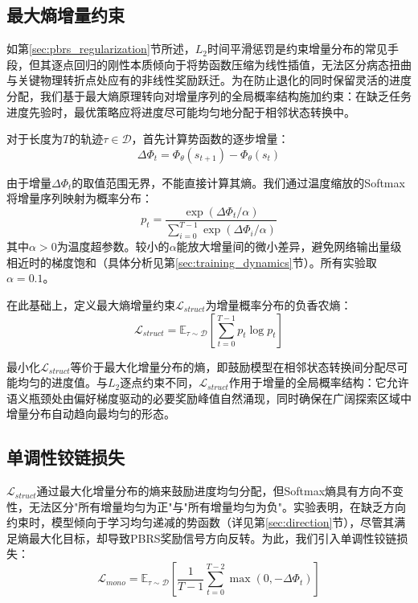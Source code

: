 \subsection{最大熵增量约束}

如第\ref{sec:pbrs_regularization}节所述，$L_2$时间平滑惩罚是约束增量分布的常见手段，但其逐点回归的刚性本质倾向于将势函数压缩为线性插值，无法区分病态扭曲与关键物理转折点处应有的非线性奖励跃迁。为在防止退化的同时保留灵活的进度分配，我们基于最大熵原理\cite{shannon1948,jaynes1957}转向对增量序列的全局概率结构施加约束：在缺乏任务进度先验时，最优策略应将进度尽可能均匀地分配于相邻状态转换中。

对于长度为$T$的轨迹$\tau \in \mathcal{D}$，首先计算势函数的逐步增量：
\begin{equation}
\label{eq:delta_phi}
    \Delta\Phi_t = \Phi_\theta(s_{t+1}) - \Phi_\theta(s_t)
\end{equation}

由于增量$\Delta\Phi_t$的取值范围无界，不能直接计算其熵。我们通过温度缩放的Softmax将增量序列映射为概率分布：
\begin{equation}
\label{eq:softmax}
    p_t = \frac{\exp(\Delta\Phi_t / \alpha)}{\sum_{i=0}^{T-1} \exp(\Delta\Phi_i / \alpha)}
\end{equation}
其中$\alpha > 0$为温度超参数。较小的$\alpha$能放大增量间的微小差异，避免网络输出量级相近时的梯度饱和（具体分析见第\ref{sec:training_dynamics}节）。所有实验取$\alpha = 0.1$。

在此基础上，定义最大熵增量约束$\mathcal{L}_{struct}$为增量概率分布的负香农熵：
\begin{equation}
\label{eq:lstruct}
    \mathcal{L}_{struct} = \mathbb{E}_{\tau \sim \mathcal{D}} \left[ \sum_{t=0}^{T-1} p_t \log p_t \right]
\end{equation}

最小化$\mathcal{L}_{struct}$等价于最大化增量分布的熵，即鼓励模型在相邻状态转换间分配尽可能均匀的进度值。与$L_2$逐点约束不同，$\mathcal{L}_{struct}$作用于增量的全局概率结构：它允许语义瓶颈处由偏好梯度驱动的必要奖励峰值自然涌现，同时确保在广阔探索区域中增量分布自动趋向最均匀的形态。

\subsection{单调性铰链损失}

$\mathcal{L}_{struct}$通过最大化增量分布的熵来鼓励进度均匀分配，但Softmax熵具有方向不变性，无法区分"所有增量均匀为正"与"所有增量均匀为负"。实验表明，在缺乏方向约束时，模型倾向于学习均匀递减的势函数（详见第\ref{sec:direction}节），尽管其满足熵最大化目标，却导致PBRS奖励信号方向反转。为此，我们引入单调性铰链损失：
\begin{equation}
\label{eq:lmono}
    \mathcal{L}_{mono} = \mathbb{E}_{\tau \sim \mathcal{D}} \left[ \frac{1}{T-1}\sum_{t=0}^{T-2} \max(0, -\Delta\Phi_t) \right]
\end{equation}

